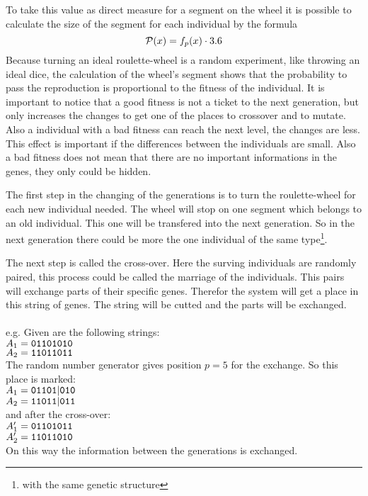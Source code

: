 To take this value as direct measure for a segment on the wheel it is possible
to calculate the size of the segment for each individual by the formula
$${\cal P}(x) = f_p(x) \cdot 3.6$$
Because turning an ideal roulette-wheel is a random experiment, like throwing
an ideal dice, the calculation of the wheel's segment shows that the probability
to pass the reproduction is proportional to the fitness of the individual. It
is important to notice that a good fitness is not a ticket to the next generation,
but only increases the changes to get one of the places to crossover and to
mutate. Also a individual with a bad fitness can reach the next level, the changes
are less. This effect is important if the differences between the individuals
are small. Also a bad fitness does not mean that there are no important informations
in the genes, they only could be hidden.

The first step in the changing of the generations is to turn the roulette-wheel
for each new individual needed. The wheel will stop on one segment which belongs
to an old individual. This one will be transfered into the next generation. So in
the next generation there could be more the one individual of the same type\footnote{
with the same genetic structure}.

The next step is called the cross-over. Here the surving individuals are randomly
paired, this process could be called the marriage of the individuals. This pairs
will exchange parts of their specific genes. Therefor the system will get a place
in this string of genes. The string will be cutted and the parts will be exchanged.\\
\\
e.g. Given are the following strings:\\
$A_1 = {\tt 01101010}$\\
$A_2 = {\tt 11011011}$\\
The random number generator gives position $p = 5$ for the exchange. So this
place is marked:\\
$A_1 = {\tt 01101|010}$\\
$A_2 = {\tt 11011|011}$\\
and after the cross-over:\\
$A_1' = {\tt 01101011}$\\
$A_2' = {\tt 11011010}$\\
On this way the information between the generations is exchanged.

